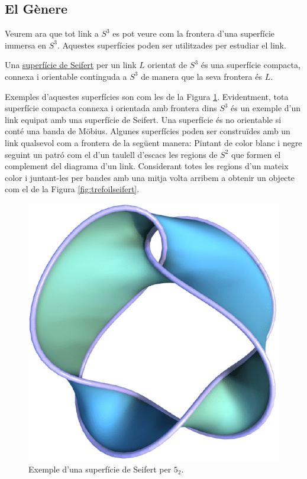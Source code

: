 
\subsection{El Gènere}\label{sec:generescomainvariant}

Veurem ara que tot link a $S^3$ es pot veure com la frontera d'una superfície immersa en $S^3$. Aquestes superfícies poden ser utilitzades per estudiar el link.

\begin{definition}\label{def:superficiedeseifert}
	Una \underline{superfície de Seifert} per un link $L$ orientat de $S^3$ és una superfície compacta, connexa i orientable continguda a $S^3$ de manera que la seva frontera és $L$.
\end{definition}

Exemples d'aquestes superfícies son com les de la Figura \ref{fig:superficiedeseifert}. Evidentment, tota superfície compacta connexa i orientada amb frontera dins $S^3$ és un exemple d'un link equipat amb una superfície de Seifert. Una superfície és no orientable si conté una banda de Möbius. Algunes superfícies poden ser construïdes amb un link qualsevol com a frontera de la següent manera: Pintant de color blanc i negre seguint un patró com el d'un taulell d'escacs les regions de $S^2$ que formen el complement del diagrama d'un link. Considerant totes les regions d'un mateix color i juntant-les per bandes amb una mitja volta arribem a obtenir un objecte com el de la Figura \ref{fig:trefoilseifert}.\\

\begin{figure}
	\centering
	\includegraphics[width=0.6\linewidth]{img/seifertsurface.png}
	\caption{Exemple d'una superfície de Seifert per $5_2$.}\label{fig:superficiedeseifert}
\end{figure}

